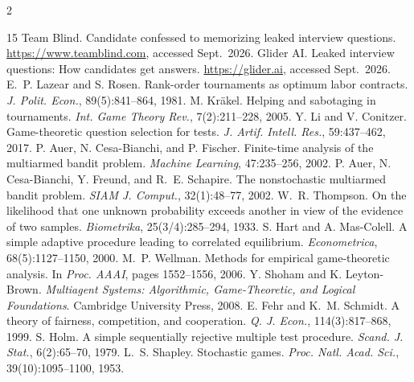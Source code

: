 \documentclass[10pt]{article}
\theoremstyle{plain}
\theoremstyle{definition}\newtheorem{definition}{Definition}
\begin{document}
{\footnotesize\setlength{\columnsep}{14pt}
\begin{multicols}{2}
\begin{thebibliography}{15}\setlength{\itemsep}{0pt}\setlength{\parskip}{0pt}
 Team Blind. Candidate confessed to memorizing leaked interview questions. \url{https://www.teamblind.com}, accessed Sept.\ 2026.
 Glider AI. Leaked interview questions: How candidates get answers. \url{https://glider.ai}, accessed Sept.\ 2026.
 E.~P. Lazear and S. Rosen. Rank-order tournaments as optimum labor contracts. \emph{J. Polit. Econ.}, 89(5):841--864, 1981.
 M. Kr\"akel. Helping and sabotaging in tournaments. \emph{Int. Game Theory Rev.}, 7(2):211--228, 2005.
 Y. Li and V. Conitzer. Game-theoretic question selection for tests. \emph{J. Artif. Intell. Res.}, 59:437--462, 2017.
 P. Auer, N. Cesa-Bianchi, and P. Fischer. Finite-time analysis of the multiarmed bandit problem. \emph{Machine Learning}, 47:235--256, 2002.
 P. Auer, N. Cesa-Bianchi, Y. Freund, and R.~E. Schapire. The nonstochastic multiarmed bandit problem. \emph{SIAM J. Comput.}, 32(1):48--77, 2002.
 W.~R. Thompson. On the likelihood that one unknown probability exceeds another in view of the evidence of two samples. \emph{Biometrika}, 25(3/4):285--294, 1933.
 S. Hart and A. Mas-Colell. A simple adaptive procedure leading to correlated equilibrium. \emph{Econometrica}, 68(5):1127--1150, 2000.
 M.~P. Wellman. Methods for empirical game-theoretic analysis. In \emph{Proc. AAAI}, pages 1552--1556, 2006.
 Y. Shoham and K. Leyton-Brown. \emph{Multiagent Systems: Algorithmic, Game-Theoretic, and Logical Foundations}. Cambridge University Press, 2008.
 E. Fehr and K.~M. Schmidt. A theory of fairness, competition, and cooperation. \emph{Q. J. Econ.}, 114(3):817--868, 1999.
 S. Holm. A simple sequentially rejective multiple test procedure. \emph{Scand. J. Stat.}, 6(2):65--70, 1979.
 L.~S. Shapley. Stochastic games. \emph{Proc. Natl. Acad. Sci.}, 39(10):1095--1100, 1953.
\end{thebibliography}
\end{multicols}}

\appendix
\end{document}
